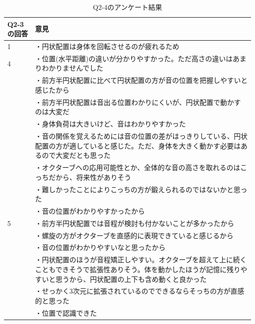 \begin{table}[H]\centering 
    \caption{Q2-4のアンケート結果}\label{tab:Q2-4}
    \begin{tabular}{lp{15cm}} \hline
    Q2-3の回答 & 意見\\ \hline
    1 & ・円状配置は身体を回転させるのが疲れるため\\[2ex]
    4 & ・位置(水平距離)の違いが分かりやすかった。ただ高さの違いはあまりわかりませんでした\\[2ex]
     & ・前方半円状配置に比べて円状配置の方が音の位置を把握しやすいと感じたから\\[2ex]
     & ・前方半円状配置は音出る位置わかりにくいが、円状配置で動かすのは大変だ\\[2ex]
     & ・身体負荷は大きいけど、音はわかりやすかった\\[2ex]
     & ・音の関係を覚えるためには音の位置の差がはっきりしている、円状配置の方が適していると感じた。ただ、身体を大きく動かす必要はあるので大変だとも思った\\[2ex]
     & ・オクターブへの応用可能性とか、全体的な音の高さを取れるのはこっちだから、将来性がありそう\\[2ex]
     & ・難しかったことによりこっちの方が鍛えられるのではないかと思った\\[2ex]
     & ・音の位置がわかりやすかったから\\[2ex]
    5 & ・前方半円状配置では音程が検討も付かないことが多かったから\\[2ex]
     & ・螺旋の方がオクターブを直感的に表現できていると感じるから\\ [2ex]
     & ・音の位置がわかりやすいなと思ったから\\ 
     & ・円状配置のほうが音程矯正しやすい。オクターブを超えて上に続くこともできそうで拡張性ありそう。体を動かしたほうが記憶に残りやすいと思うから、円状配置の上下も含め動くと良かった\\
     & ・せっかく3次元に拡張されているのでできるならそっちの方が直感的と思った\\[2ex]
     & ・位置で認識できた\\\hline
    \end{tabular}
\end{table}


